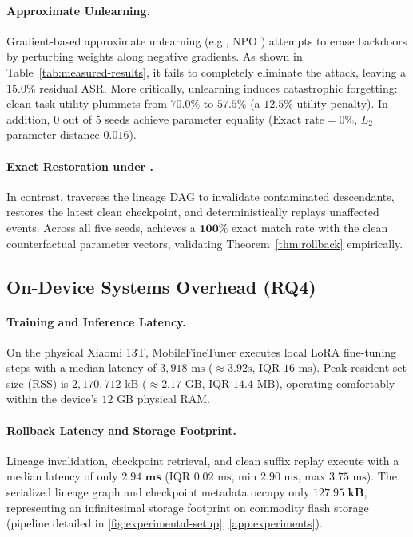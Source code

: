 \paragraph{Approximate Unlearning.}
Gradient-based approximate unlearning (e.g., NPO \cite{zhang2024npo}) attempts to erase backdoors by perturbing weights along negative gradients. As shown in Table~\ref{tab:measured-results}, it fails to completely eliminate the attack, leaving a $15.0\%$ residual ASR. More critically, unlearning induces catastrophic forgetting: clean task utility plummets from $70.0\%$ to $57.5\%$ (a $12.5\%$ utility penalty). In addition, $0$ out of $5$ seeds achieve parameter equality ($\text{Exact rate}=0\%$, $L_2$ parameter distance $0.016$).

\paragraph{Exact Restoration under \PG{}.}
In contrast, \PG{} traverses the lineage DAG to invalidate contaminated descendants, restores the latest clean checkpoint, and deterministically replays unaffected events. Across all five seeds, \PG{} achieves a $\mathbf{100\%}$ exact match rate with the clean counterfactual parameter vectors, validating Theorem~\ref{thm:rollback} empirically.

\subsection{On-Device Systems Overhead (RQ4)}

\paragraph{Training and Inference Latency.}
On the physical Xiaomi 13T, MobileFineTuner executes local LoRA fine-tuning steps with a median latency of $3,918\text{ ms}$ ($\approx 3.92\text{s}$, IQR $16\text{ ms}$). Peak resident set size (RSS) is $2,170,712\text{ kB}$ ($\approx 2.17\text{ GB}$, IQR $14.4\text{ MB}$), operating comfortably within the device's $12\text{ GB}$ physical RAM.

\paragraph{Rollback Latency and Storage Footprint.}
Lineage invalidation, checkpoint retrieval, and clean suffix replay execute with a median latency of only $\mathbf{2.94\text{ ms}}$ (IQR $0.02\text{ ms}$, min $2.90\text{ ms}$, max $3.75\text{ ms}$). The serialized lineage graph and checkpoint metadata occupy only $\mathbf{127.95\text{ kB}}$, representing an infinitesimal storage footprint on commodity flash storage (pipeline detailed in \cref{fig:experimental-setup}, \cref{app:experiments}).

